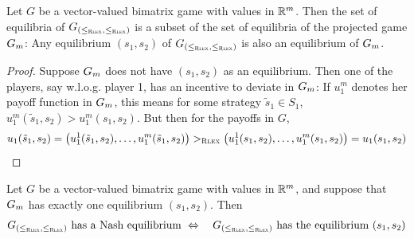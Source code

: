 \documentclass[a4paper]{scrreprt}
\begin{document}
    \begin{lemma}
        Let $G$ be a vector-valued bimatrix game with values in $\mathbb{R}^m$.
        Then the set of equilibria of $G_{(\leq_{\textsc{Rlex}},\leq_{\textsc{Rlex}})}$ is a subset of the set of equilibria of the projected game $G_{m}$:
        Any equilibrium $(s_1, s_2)$ of $G_{(\leq_{\textsc{Rlex}},\leq_{\textsc{Rlex}})}$ is also an equilibrium of $G_{m}$.
    \end{lemma}
    \begin{proof}
        Suppose $G_{m}$ does not have $(s_1, s_2)$ as an equilibrium.
        Then one of the players, say w.l.o.g. player 1, has an incentive to deviate in $G_{m}$: If $u_1^{m}$ denotes her payoff function in $G_{m}$,
        this means for some strategy $\tilde{s}_1 \in S_1$, $u_1^{m}(\tilde{s}_1, s_2) > u_1^{m}(s_1, s_2)$.
        But then for the payoffs in $G$, 
        \begin{gather*}
            u_1(\tilde{s}_1, s_2) = \bigl(u_1^{1}(\tilde{s}_1, s_2), \dots, u_1^{m}(\tilde{s}_1, s_2)\bigr)
            >_{\textsc{Rlex}} \bigl(u_1^{1}(s_1, s_2), \dots, u_1^{m}(s_1, s_2)\bigr) = u_1(s_1, s_2)
        \end{gather*}
    \end{proof}

    \begin{cor}
        Let $G$ be a vector-valued bimatrix game with values in $\mathbb{R}^m$, and suppose that  $G_{m}$ has exactly one equilibrium $(s_1, s_2)$.
        Then
        \begin{gather*}
            G_{(\leq_{\textsc{Rlex}},\leq_{\textsc{Rlex}})} \text{ has a Nash equilibrium } 
            \Leftrightarrow\quad G_{(\leq_{\textsc{Rlex}},\leq_{\textsc{Rlex}})} \text{ has the equilibrium } (s_1, s_2)     
        \end{gather*}
    \end{cor}
\end{document}
